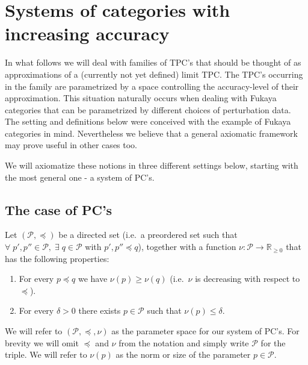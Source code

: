 \section{Systems of categories with increasing accuracy}\label{se:sys}\label{s:sys-tpc}

In what follows we will deal with families of TPC's that should be
thought of as approximations of a (currently not yet defined) limit TPC. The
TPC's occurring in the family are parametrized by a space controlling
the accuracy-level of their approximation. This situation naturally
occurs when dealing with Fukaya categories that can be parametrized by
different choices of perturbation data. The setting and definitions
below were conceived with the example of Fukaya categories in
mind. Nevertheless we believe that a general axiomatic framework may
prove useful in other cases too.

We will axiomatize these notions in three different settings below,
starting with the most general one - a system of PC's.

\subsection{The case of PC's} \label{sb:sys-pc}
Let $(\mathcal{P}, \preceq)$ be a directed set (i.e.~a preordered set
such that
$\forall \; p', p'' \in \mathcal{P}, \; \exists \; q \in \mathcal{P}$
with $p', p'' \preceq q$), together with a function
$\nu: \mathcal{P} \longrightarrow \mathbb{R}_{\geq 0}$ that has the
following properties:
\begin{enumerate}
\item For every $p \preceq q$ we have $\nu(p) \geq \nu(q)$ (i.e.~$\nu$
  is decreasing with respect to $\preceq$).
\item For every $\delta>0$ there exists $p \in \mathcal{P}$ such that
  $\nu(p) \leq \delta$.
\end{enumerate}

We will refer to $(\mathcal{P}, \preceq , \nu)$ as the parameter space
for our system of PC's. For brevity we will omit $\preceq$ and $\nu$
from the notation and simply write $\mathcal{P}$ for the triple. We
will refer to $\nu(p)$ as the norm or size of the parameter
$p \in \mathcal{P}$.

